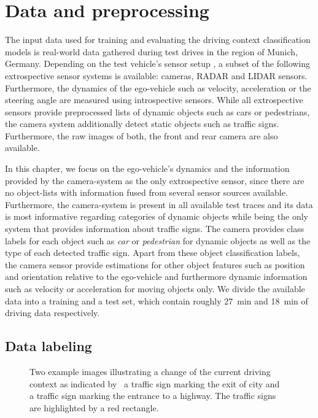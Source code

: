 \section{Data and preprocessing}%
\label{sec:data_and_preprocessing_context_classification}

The input data used for training and evaluating the driving context classification models is real-world data gathered during test drives in the region of Munich, Germany.
Depending on the test vehicle's sensor setup \cite{Aeberhard2015}, a subset of the following extrospective sensor systems is available: cameras, \ac{RADAR} and \ac{LIDAR} sensors.
Furthermore, the dynamics of the ego-vehicle such as velocity, acceleration or the steering angle are measured using introspective sensors.
While all extrospective sensors provide preprocessed lists of dynamic objects such as cars or pedestrians, the camera system additionally detect static objects such as traffic signs.
Furthermore, the raw images of both, the front and rear camera are also available. 

In this chapter, we focus on the ego-vehicle's dynamics and the information provided by the camera-system as the only extrospective sensor, since there are no object-lists with information fused from several sensor sources available.
Furthermore, the camera-system is present in all available test traces and its data is most informative regarding categories of dynamic objects while being the only system that provides information about traffic signs.
The camera provides class labels for each object such as \emph{car} or \emph{pedestrian} for dynamic objects as well as the type of each detected traffic sign.
Apart from these object classification labels, the camera sensor provide estimations for other object features such as position and orientation relative to the ego-vehicle and furthermore dynamic information such as velocity or acceleration for moving objects only.
We divide the available data into a training and a test set, which contain roughly \SI{27}{\minute} and \SI{18}{\minute} of driving data respectively.

\subsection{Data labeling}%
\label{subsec:data_labeling}

\begin{figure}[t]
    \centering
    \caption{Two example images illustrating a change of the current driving context as indicated by~\protect{} a traffic sign marking the exit of city and~\protect{} a traffic sign marking the entrance to a highway.
    The traffic signs are highlighted by a red rectangle.}
    \label{fig:context_class_manual_labeling}
\end{figure}


